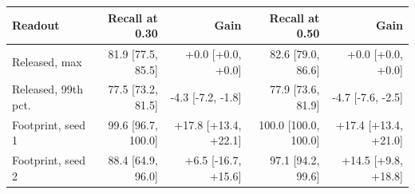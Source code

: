 \begin{tabular}{lrrrr}
\toprule
Readout & Recall at 0.30 & Gain & Recall at 0.50 & Gain \\
\midrule
Released, max & 81.9 [77.5, 85.5] & +0.0 [+0.0, +0.0] & 82.6 [79.0, 86.6] & +0.0 [+0.0, +0.0] \\
Released, 99th pct. & 77.5 [73.2, 81.5] & -4.3 [-7.2, -1.8] & 77.9 [73.6, 81.9] & -4.7 [-7.6, -2.5] \\
Footprint, seed 1 & 99.6 [96.7, 100.0] & +17.8 [+13.4, +22.1] & 100.0 [100.0, 100.0] & +17.4 [+13.4, +21.0] \\
Footprint, seed 2 & 88.4 [64.9, 96.0] & +6.5 [-16.7, +15.6] & 97.1 [94.2, 99.6] & +14.5 [+9.8, +18.8] \\
\bottomrule
\end{tabular}
